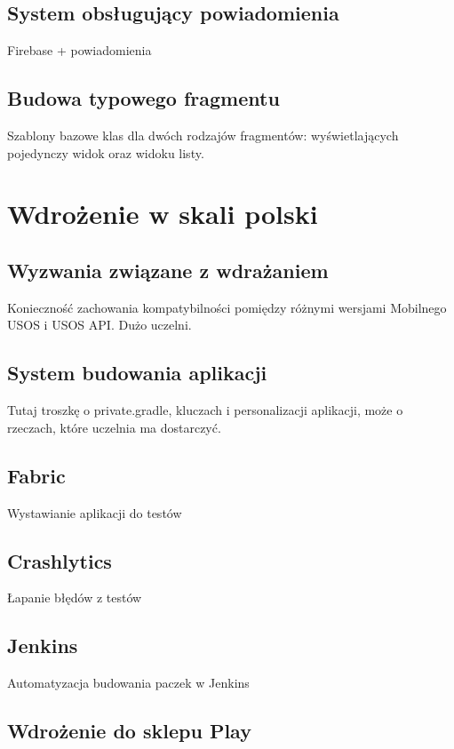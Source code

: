\documentclass{pracamgr}
\begin{document}
\section{System obsługujący powiadomienia}

Firebase + powiadomienia

\section{Budowa typowego fragmentu}

Szablony bazowe klas dla dwóch rodzajów fragmentów:
wyświetlających pojedynczy widok oraz widoku listy.

\chapter{Wdrożenie w skali polski}

\section{Wyzwania związane z wdrażaniem}

Konieczność zachowania kompatybilności pomiędzy różnymi
wersjami Mobilnego USOS i USOS API. Dużo uczelni.

\section{System budowania aplikacji}

Tutaj troszkę o private.gradle, kluczach i personalizacji aplikacji,
może o rzeczach, które uczelnia ma dostarczyć.

\section{Fabric}

Wystawianie aplikacji do testów

\section{Crashlytics}

Łapanie błędów z testów

\section{Jenkins}

Automatyzacja budowania paczek w Jenkins

\section{Wdrożenie do sklepu Play}
\end{document}
